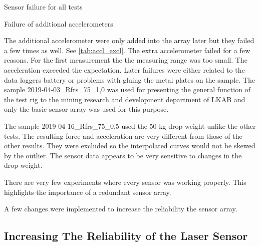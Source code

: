 \begin{landscape}
\begin{table}
    \centering

\caption{Sensor failure for all tests}
    \label{tab:excl}
\end{table}
\end{landscape}

\begin{table}
    \centering

    \caption{Failure of additional accelerometers}
    \label{tab:accl_excl}
\end{table}

The additional accelerometer were only added into the array later but they failed a few times as well. See \autoref{tab:accl_excl}. The extra accelerometer failed for a few reasons. For the first measurement the the measuring range was too small. The acceleration exceeded the expectation. Later failures were either related to the data loggers battery or problems with gluing the metal plates on the sample. The sample 2019-04-03\_Rfrs\_75\_1,0 was used for presenting the general function of the test rig to the mining research and development department of LKAB and only the basic sensor array was used for this purpose.

The sample 2019-04-16\_Rfrs\_75\_0,5 used the 50 kg drop weight unlike the other tests. The resulting force and acceleration are very different from those of the other results. They were excluded so the interpolated curves would not be skewed by the outlier. The sensor data appears to be very sensitive to changes in the drop weight.

There are very few experiments where every sensor was working properly. This highlights the importance of a redundant sensor array.

A few changes were implemented to increase the reliability the sensor array.

\subsection{Increasing The Reliability of the Laser Sensor}

